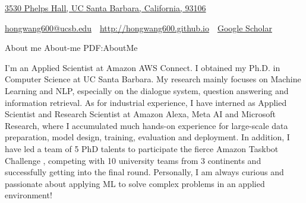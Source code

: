 \documentclass[letterpaper,MMMyyyy,nonstopmode]{simpleresumecv}
\newcommand{\CVAuthor}{Hong Wang}
\newcommand{\CVWebpage}{http://hongwang600.github.io}
\begin{document}

\Title{\CVAuthor}

\begin{SubTitle}
\href{https://www.google.com/maps/place/Phelps+Hall/@34.4161308,-119.8468366,17z/data=!3m1!4b1!4m5!3m4!1s0x80e93f7042b51aa9:0xc80cbd08cacd9e49!8m2!3d34.4161308!4d-119.8446426}
{3530 Phelps Hall, UC Santa Barbara, California, 93106}
\par
\href{mailto:hongwang600@ucsb.edu}
{hongwang600@ucsb.edu}
\,\SubBulletSymbol\,
\href{\CVWebpage}
{\url{\CVWebpage}}
\,\SubBulletSymbol\,
\href{https://scholar.google.com/citations?user=M9uQHIUAAAAJ&hl=en&authuser=1#}
{Google Scholar}
\end{SubTitle}

\begin{Body}





\Section
{About me}
{About-me}
{PDF:AboutMe}

\Entry
I'm an Applied Scientist at Amazon AWS Connect. I obtained my Ph.D. in Computer Science at UC Santa Barbara. My research mainly focuses on Machine Learning and NLP, especially on the dialogue system, question answering and information retrieval. As for industrial experience, I have interned as Applied Scientist and Research Scientist at Amazon Alexa, Meta AI and Microsoft Research, where I accumulated much hands-on experience for large-scale data preparation, model design, training, evaluation and deployment. In addition, I have led a team of 5 PhD talents to participate the fierce Amazon Taskbot Challenge , competing with 10 university teams from 3 continents and successfully getting into the final round. Personally, I am always curious and passionate about applying ML to solve complex problems in an applied environment! 



\end{Body}
\end{document}
